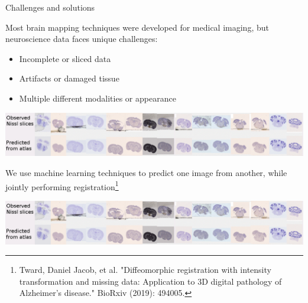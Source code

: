 \documentclass{beamer}
\begin{document}
\begin{frame}{Challenges and solutions}

Most brain mapping techniques were developed for medical imaging, but  neuroscience data faces unique challenges:


\begin{itemize}


\item 
Incomplete or sliced data

\item 
Artifacts or damaged tissue

\item 
Multiple different modalities or appearance

\end{itemize}

\includegraphics[width=\textwidth,clip,trim=0in 1.3in 0in 0in]{720exampleslices-edit}

\vspace{1em}

We use machine learning techniques to predict one image from another, while \alert{jointly} performing registration\footnote{ Tward, Daniel Jacob, et al. "Diffeomorphic registration with intensity transformation and missing data: Application to 3D digital pathology of Alzheimer's disease." BioRxiv (2019): 494005.}

\vspace{1em}
\includegraphics[width=\textwidth,clip,trim=0in 0in 0in 1.3in]{720exampleslices-edit}


\end{frame}
\end{document}
